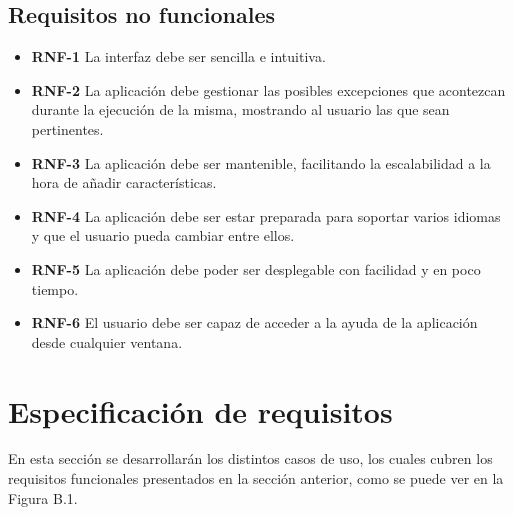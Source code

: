 \subsection{Requisitos no funcionales}

\begin{itemize}
	\item \textbf{RNF-1} La interfaz debe ser sencilla e intuitiva.
	\item \textbf{RNF-2} La aplicación debe gestionar las posibles excepciones que acontezcan durante la ejecución de la misma, mostrando al usuario las que sean pertinentes.
	\item \textbf{RNF-3} La aplicación debe ser mantenible, facilitando la escalabilidad a la hora de añadir características.
	\item \textbf{RNF-4} La aplicación debe ser estar preparada para soportar varios idiomas y que el usuario pueda cambiar entre ellos.
	\item \textbf{RNF-5} La aplicación debe poder ser desplegable con facilidad y en poco tiempo.
	\item \textbf{RNF-6} El usuario debe ser capaz de acceder a la ayuda de la aplicación desde cualquier ventana.
	
\end{itemize}

\section{Especificación de requisitos}

En esta sección se desarrollarán los distintos casos de uso, los cuales cubren los requisitos funcionales presentados en la sección anterior, como se puede ver en la Figura B.1.


